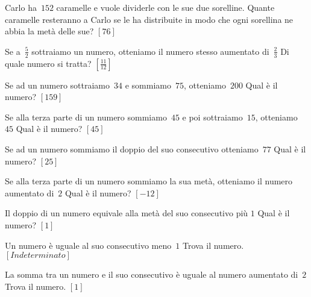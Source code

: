 \begin{multicols}{2}
\begin{esercizio}[\Ast]
\label{ese:14.9}
Carlo ha~\(152\) caramelle e vuole dividerle con le sue due sorelline. Quante 
caramelle resteranno a Carlo se le ha distribuite in modo che ogni sorellina ne 
abbia la metà delle sue? \hfill \(\left[76\right]\)
\end{esercizio}

\begin{esercizio}[\Ast]
\label{ese:14.10}
Se a~\(\frac{5}{2}\) sottraiamo un numero, otteniamo il numero stesso aumentato 
di~\(\frac{2}{3}\) Di quale numero si tratta? \hfill \(\left[\frac{11}{12}\right]\)
\end{esercizio}

\begin{esercizio}[\Ast]
\label{ese:14.11}
Se ad un numero sottraiamo~\(34\) e sommiamo~\(75\), otteniamo~\(200\) Qual è il 
numero? \hfill \(\left[159\right]\)
\end{esercizio}

\begin{esercizio}[\Ast]
\label{ese:14.12}
Se alla terza parte di un numero sommiamo~\(45\) e poi sottraiamo~\(15\), 
otteniamo~\(45\) Qual è il numero? \hfill \(\left[45\right]\)
\end{esercizio}

\begin{esercizio}[\Ast]
\label{ese:14.13}
Se ad un numero sommiamo il doppio del suo consecutivo otteniamo~\(77\) Qual è il 
numero? \hfill \(\left[25\right]\)
\end{esercizio}

\begin{esercizio}[\Ast]
\label{ese:14.14}
Se alla terza parte di un numero sommiamo la sua metà, otteniamo il numero 
aumentato di~\(2\) Qual è il numero? \hfill \(\left[-12\right]\)
\end{esercizio}

\begin{esercizio}[\Ast]
\label{ese:14.15}
Il doppio di un numero equivale alla metà del suo consecutivo più \(1\) Qual è il 
numero? \hfill \(\left[1\right]\)
\end{esercizio}

\begin{esercizio}[\Ast]
\label{ese:14.16}
Un numero è uguale al suo consecutivo meno~\(1\) Trova il numero. 
\hfill \(\left[Indeterminato\right]\)
\end{esercizio}

\begin{esercizio}[\Ast]
\label{ese:14.17}
La somma tra un numero e il suo consecutivo è uguale al numero aumentato di~\(2\) 
Trova il numero. \hfill \(\left[1\right]\)
\end{esercizio}


\end{multicols}
